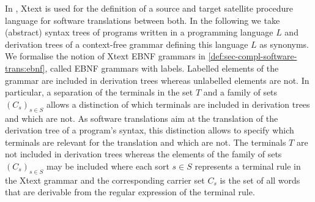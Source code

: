 In \cite{DBLP:conf/icmt/0001GNEBMPEE14}, Xtext is used for the definition of a source and target satellite procedure language for software translations between both.
In the following we take (abstract) syntax trees of programs written in a programming language $L$ and derivation trees of a context-free grammar defining this language $L$ as synonyms.
We formalise the notion of Xtext EBNF grammars in \cref{def:sec-compl-software-trans:ebnf}, called EBNF grammars with labels.
Labelled elements of the grammar are included in derivation trees whereas unlabelled elements are not. 
In particular, a separation of the terminals in the set $T$ and a family of sets $(C_s)_{s \in S}$ allows a distinction of which terminals are included in derivation trees and which are not.
As software translations aim at the translation of the derivation tree of a program's syntax, this distinction allows to specify which terminals are relevant for the translation and which are not.
The terminals $T$ are not included in derivation trees whereas the elements of the family of sets $(C_s)_{s \in S}$ may be included where each sort $s \in S$ represents a terminal rule in the Xtext grammar and the corresponding carrier set $C_s$ is the set of all words that are derivable from the regular expression of the terminal rule.

